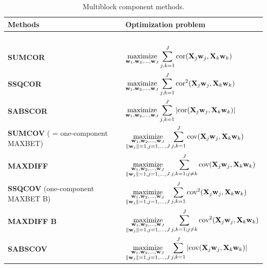\documentclass[
]{jss}
\begin{document}
\begin{table}[!h]
\centering
\begin{tabular}{p{7.5cm}l}
\hline
\textbf{Methods} & \textbf{Optimization problem} \\
\hline
~\\
\textbf{SUMCOR} \citep{Horst1961} & $ \underset{\mathbf{w}_1, \mathbf{w}_2, \ldots,\mathbf{w}_J}{\text{maximize}}
\displaystyle \sum_{j, k = 1}^J \text{cor}(\mathbf{X}_j\mathbf{w}_j, \mathbf{X}_k\mathbf{w}_k) $ \\

\textbf{SSQCOR} \citep{Kettenring1971} &  $ \underset{\mathbf{w}_1, \mathbf{w}_2, \ldots,\mathbf{w}_J}{\text{maximize}}
\displaystyle \sum_{j, k = 1}^J \text{cor}^2(\mathbf{X}_j\mathbf{w}_j, \mathbf{X}_k\mathbf{w}_k)
$ \\

\textbf{SABSCOR} \citep{Hanafi2007} &  $ \underset{\mathbf{w}_1, \mathbf{w}_2, \ldots,\mathbf{w}_J}{\text{maximize}}
\displaystyle \sum_{j, k = 1}^J \vert \text{cor}(\mathbf{X}_j\mathbf{w}_j, \mathbf{X}_k\mathbf{w}_k) \vert$
\\

\textbf{SUMCOV} ( = one-component MAXBET) \citep{VandeGeer1984} & $ \underset{\substack{\mathbf{w}_1, \mathbf{w}_2, \ldots,\mathbf{w}_J\\ \Vert \mathbf{w}_j \Vert = 1, j=1, \ldots, J}} {\text{maximize}} \displaystyle \sum_{j, k = 1}^J \text{cov}(\mathbf{X}_j\mathbf{w}_j, \mathbf{X}_k\mathbf{w}_k)$ \\

\textbf{MAXDIFF} \citep{VandeGeer1984} & $ \underset{\substack{\mathbf{w}_1, \mathbf{w}_2, \ldots,\mathbf{w}_J\\ \Vert \mathbf{w}_j \Vert = 1, j=1, \ldots, J}} {\text{maximize}} \displaystyle \sum_{j, k = 1 ; j \ne k}^J \text{cov}(\mathbf{X}_j\mathbf{w}_j, \mathbf{X}_k\mathbf{w}_k)$ \\

\textbf{SSQCOV} (one-component MAXBET B) \citep{Hanafi2006}&  $
\underset{\substack{\mathbf{w}_1, \mathbf{w}_2, \ldots,\mathbf{w}_J\\ \Vert \mathbf{w}_j \Vert = 1, j=1, \ldots, J}}{\text{maximize}}
\displaystyle\sum_{j, k = 1}^J \text{cov}^2(\mathbf{X}_j\mathbf{w}_j, \mathbf{X}_k\mathbf{w}_k)
$ \\

\textbf{MAXDIFF B} \citep{Hanafi2006}&  $
\underset{\substack{\mathbf{w}_1, \mathbf{w}_2, \ldots,\mathbf{w}_J\\ \Vert \mathbf{w}_j \Vert = 1, j=1, \ldots, J}}{\text{maximize}}
\displaystyle\sum_{j, k = 1 ; j \ne k}^J \text{cov}^2(\mathbf{X}_j\mathbf{w}_j, \mathbf{X}_k\mathbf{w}_k)
$ \\

\textbf{SABSCOV} \citep{Tenenhaus2011, Kramer2007}&  $
\underset{\substack{\mathbf{w}_1, \mathbf{w}_2, \ldots,\mathbf{w}_J\\ \Vert \mathbf{w}_j \Vert = 1, j=1, \ldots, J}}{\text{maximize}}
\displaystyle\sum_{j, k = 1}^J \vert \text{cov}(\mathbf{X}_j\mathbf{w}_j, \mathbf{X}_k\mathbf{w}_k) \vert
$ \\

\hline
\end{tabular}
\caption{Multiblock component methods. \label{multiblock_methods}}
\end{table}
\end{document}
